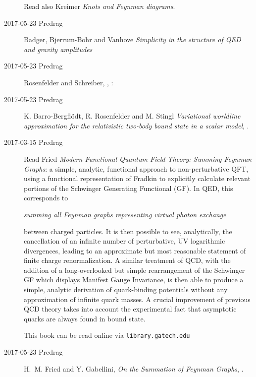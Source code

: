 \begin{description}
Read also Kreimer
{\em Knots and {Feynman} diagrams}.


\item[2017-05-23 Predrag]
Badger, Bjerrum-Bohr and Vanhove
{\em Simplicity in the structure of {QED} and gravity amplitudes}

\item[2017-05-23 Predrag]
Rosenfelder and Schreiber,
, :

\item[2017-05-23 Predrag]
K. Barro-Bergfl\"odt, R. Rosenfelder and M. Stingl {\em
Variational worldline approximation for the relativistic two-body bound
state in a scalar model}, .

\item[2017-03-15 Predrag] Read
Fried
{\em Modern Functional Quantum Field Theory: Summing Feynman Graphs}:
a simple, analytic, functional approach to non-perturbative QFT, using a
functional representation of Fradkin to explicitly
calculate relevant portions of the Schwinger Generating Functional (GF).
In QED, this corresponds to

\emph{summing all Feynman graphs representing virtual photon exchange}

between charged particles. It is then possible to
see, analytically, the cancellation of an infinite number of
perturbative, UV logarithmic divergences, leading to an approximate but
most reasonable statement of finite charge renormalization. A similar
treatment of QCD, with the addition of a long-overlooked but simple
rearrangement of the Schwinger GF which displays Manifest Gauge
Invariance, is then able to produce a simple, analytic derivation of
quark-binding potentials without any approximation of infinite quark
masses. A crucial improvement of previous QCD theory takes into account
the experimental fact that asymptotic quarks are always found in bound
state.

This book can be read online via \texttt{library.gatech.edu}


\item[2017-05-23 Predrag]
H.~M. Fried and Y. Gabellini,
{\em On the Summation of Feynman Graphs}, .


\end{description}
